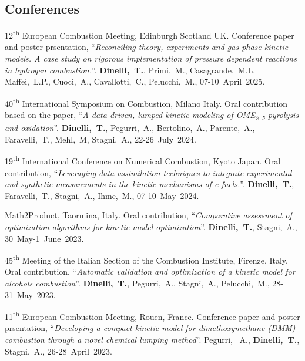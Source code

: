 \subsection{Conferences}
\begin{etaremune}
    \item
    12\textsuperscript{th} European Combustion Meeting, Edinburgh Scotland UK. Conference
    paper and poster prsentation, ``{\it Reconciling theory, experiments and gas-phase
    kinetic models. A case study on rigorous implementation of pressure dependent
    reactions in hydrogen combustion.}''. {\bf Dinelli,~T.}, Primi,~M., Casagrande,~M.L.
    Maffei,~L.P., Cuoci,~A., Cavallotti,~C., Pelucchi,~M.,
    07-10~April~2025.

    \item
    40\textsuperscript{th} International Symposium on Combustion, Milano Italy. Oral
    contribution based on the paper, ``{\it A data-driven, lumped kinetic modeling of
    OME\textsubscript{2-5} pyrolysis and oxidation}''. {\bf Dinelli,~T.},
    Pegurri,~A., Bertolino,~A., Parente,~A., Faravelli,~T., Mehl,~M, Stagni,~A.,
    22-26~July~2024.

    \item
    19\textsuperscript{th} International Conference on Numerical Combustion, Kyoto
    Japan. Oral contribution, ``{\it Leveraging data assimilation techniques to
    integrate experimental and synthetic measurements in the kinetic mechanisms of
    e-fuels.}''. {\bf Dinelli,~T.}, Faravelli,~T., Stagni,~A., Ihme,~M.,
    07-10~May~2024.

    \item
    Math2Product, Taormina, Italy. Oral contribution, ``{\it Comparative
    assessment of optimization algorithms for kinetic model optimization}''.
    {\bf Dinelli,~T.}, Stagni,~A.,
    30~May-1~June~2023.

    \item
    45\textsuperscript{th} Meeting of the Italian Section of the Combustion Institute,
    Firenze, Italy. Oral contribution, ``{\it Automatic validation and optimization
    of a kinetic model for alcohols combustion}''. {\bf Dinelli,~T.},
    Pegurri,~A., Stagni,~A., Pelucchi,~M.,
    28-31~May~2023.

    \item
    11\textsuperscript{th} European Combustion Meeting, Rouen, France. Conference paper
    and poster prsentation, ``{\it Developing a compact kinetic model for
    dimethoxymethane (DMM) combustion through a novel chemical lumping method}''.
    Pegurri, ~A., {\bf Dinelli,~T.}, Stagni,~A.,
    26-28~April~2023.


\end{etaremune}
